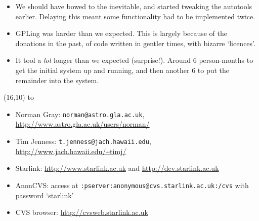 \documentclass[a0,portrait]{a0poster-ng}
\def\RHead#1{\noindent\hbox to \hsize{\hfil{\LARGE\color{DarkBlue} #1\par}}\bigskip}
\let\Head\RHead
\def\RHead#1{\noindent\hbox to \hsize{\hfil{\huge\color{DarkBlue} #1\par}}\bigskip}
\let\Head\RHead
\begin{document}
\begin{textblock}{7}
\begin{itemize}
\item We should have bowed to the inevitable, and started tweaking the
  autotools earlier.  Delaying this meant some functionality had to be
  implemented twice.

\item GPLing was harder than we expected.  This is largely because of
  the donations in the past, of code written in gentler times, with
  bizarre `licences'.

\item It tool a \emph{lot} longer than we expected (surprise!).  Around 6
  person-months to get the initial system up and running, and then
  another 6 to put the remainder into the system.

\end{itemize}

\end{textblock}

\begin{textblock}{7}(16,10)
\Head{Contacts}
\normalsize
\raggedright
\begin{itemize}
\item Norman Gray: \texttt{norman@astro.gla.ac.uk},
  \url{http://www.astro.gla.ac.uk/users/norman/}

\item Tim Jenness: \texttt{t.jenness@jach.hawaii.edu},
  \url{http://www.jach.hawaii.edu/~timj/}

\item Starlink: \url{http://www.starlink.ac.uk} and
  \url{http://dev.starlink.ac.uk}

\item AnonCVS: access at
  \texttt{:pserver:anonymous@cvs.starlink.ac.uk:/cvs} 
  with password `starlink'

\item CVS browser: \url{http://cvsweb.starlink.ac.uk}
\end{itemize}
  
\end{textblock}
\end{document}
